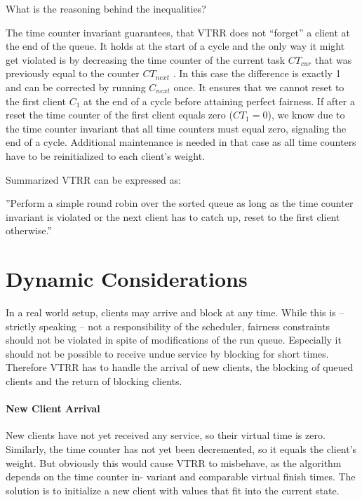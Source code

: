 What is the reasoning behind the inequalities?

The time counter invariant guarantees, that VTRR does not ``forget'' a client at the end
of the queue. It holds at the start of a cycle and the only way it might get violated is by
decreasing the time counter of the current task $CT_{cur}$ that was previously equal to the
counter $CT_{next}$ . In this case the difference is exactly 1 and can be corrected by running
$C_{next}$ once. It ensures that we cannot reset to the first client $C_1$ at the end of a cycle
before attaining perfect fairness. If after a reset the time counter of the first client equals
zero ($CT_1 = 0$), we know due to the time counter invariant that all time counters must
equal zero, signaling the end of a cycle. Additional maintenance is needed in that case as
all time counters have to be reinitialized to each client’s weight.

Summarized VTRR can be expressed as:

''Perform a simple round robin over the sorted queue as long as the time counter invariant
     is violated or the next client has to catch up, reset to the first client otherwise.''


\section{Dynamic Considerations}

In a real world setup, clients may arrive and block at any time. While this is – strictly
speaking – not a responsibility of the scheduler, fairness constraints should not be violated
in spite of modifications of the run queue. Especially it should not be possible to receive
undue service by blocking for short times. Therefore VTRR has to handle the arrival of
new clients, the blocking of queued clients and the return of blocking clients.

\paragraph{New Client Arrival}

New clients have not yet received any service, so their virtual time is zero. Similarly, the
time counter has not yet been decremented, so it equals the client’s weight. But obviously
this would cause VTRR to misbehave, as the algorithm depends on the time counter in-
variant and comparable virtual finish times. The solution is to initialize a new client with
values that fit into the current state.


